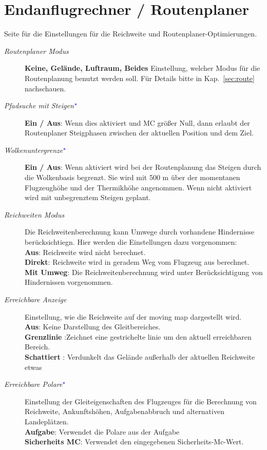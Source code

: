 \section{Endanflugrechner / Routenplaner}\label{sec:final-route}
Seite für die Einstellungen für die Reichweite und Routenplaner-Optimierungen.

\begin{description}
\item[\textit{Routenplaner Modus}]  \label{conf:routemode} {\bf Keine, Gelände, Luftraum, Beides}
  Einstellung, welcher Modus für die Routenplanung benutzt werden soll. Für Details bitte in Kap.~\ref{sec:route} nachschauen.
\item[\textit{Pfadsuche mit Steigen$^{\textcolor{blue}{\star}}$}]  {\bf Ein / Aus}: \label{conf:routeclimb} Wenn dies aktiviert und MC größer Null, dann erlaubt der Routenplaner
  Steigphasen zwischen der aktuellen Position und dem Ziel.
\item[\textit{Wolkenuntergrenze$^{\textcolor{blue}{\star}}$}]  \label{conf:routeceiling}{\bf Ein / Aus}:  Wenn aktiviert wird bei der Routenplanung  das Steigen durch die Wolkenbasis begrenzt. Sie wird mit 500 m über der momentanen Flugzeughöhe und der Thermikhöhe angenommen.
  Wenn nicht aktiviert wird mit unbegrenztem Steigen geplant.
\item[\textit{Reichweiten Modus}]  \label{conf:turningreach} Die Reichweitenberechnung kann Umwege durch vorhandene Hindernisse berücksichtiegn.
  Hier werden die Einstellungen dazu vorgenommen:\\
  {\bf Aus}: Reichweite wird nicht berechnet.\\
  {\bf Direkt}: Reichweite wird in geradem Weg vom Flugzeug aus berechnet.\\
  {\bf Mit Umweg}: Die Reichweitenberechnung wird unter Berücksichtigung von Hindernissen vorgenommen.
\item[\textit{Erreichbare Anzeige}]  \label{conf:gliderange} Einstellung, wie die Reichweite auf der moving map dargestellt wird.\\
  {\bf Aus}: Keine Darstellung des Gleitbereiches.\\
  {\bf Grenzlinie }:Zeichnet eine gestrichelte linie um den aktuell erreichbaren Bereich.\\
  {\bf Schattiert }: Verdunkelt das Gelände außerhalb der aktuellen Reichweite etwas
\item[\textit{Erreichbare Polare$^{\textcolor{blue}{\star}}$}]  \label{conf:reachpolar}
   Einstellung der Gleiteigenschaften des Flugzeuges für die Berechnung von Reichweite, Ankunftshöhen, Aufgabenabbruch und alternativen Landeplätzen.\\
  {\bf Aufgabe}: Verwendet die Polare aus der Aufgabe\\
  {\bf Sicherheits MC}: Verwendet den eingegebenen Sicherheits-Mc-Wert.
\end{description}


